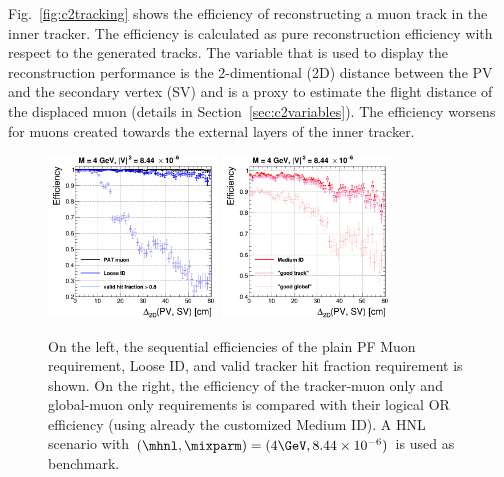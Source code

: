 Fig.~\ref{fig:c2tracking} shows the efficiency of
reconstructing a muon track in the inner tracker. The efficiency is
calculated as pure reconstruction efficiency with respect to the
generated tracks. The variable that is used to display the reconstruction
performance is the 2-dimentional (2D) distance between the PV and the secondary vertex (SV)
and is a proxy to estimate the flight distance of the
displaced muon (details in Section~\ref{sec:c2variables}). The efficiency worsens for muons created towards the external layers of the inner
tracker.
\begin{figure}[h!]
\centering
  \includegraphics[width=0.4\textwidth]{Figures/c6/object/loose_validFraction_M-4_V-0p00290516780927_rho.png}
  \includegraphics[width=0.4\textwidth]{Figures/c6/object/goodTrack_goodGlobal_M-4_V-0p00290516780927_rho.png}
  \caption{On the left, the sequential
efficiencies of the plain PF Muon requirement, Loose ID, and
valid tracker hit fraction requirement is shown. On the right, the efficiency of the tracker-muon only and
    global-muon only requirements is compared with their logical OR
    efficiency (using already the customized Medium ID). A HNL scenario with
    $(\mhnl,\mixparm)=(4\GeV,8.44\times10^{-6})$ is used as
    benchmark. \dani}
  \label{fig:c2tracking2}
\end{figure}

